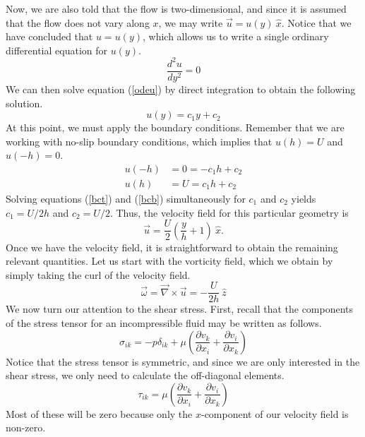 Now, we are also told that the flow is two-dimensional, and since it is assumed that the flow does not vary along $x$, we may write $\vec{u} = u(y)\ \hat{x}$. Notice that we have concluded that $u=u(y)$, which allows us to write a single ordinary differential equation for $u(y)$.
\begin{equation}
    \frac{d^2u}{dy^2} = 0
    \label{odeu}
\end{equation}
We can then solve equation (\ref{odeu}) by direct integration to obtain the following solution.
\begin{equation}
    u(y) = c_1 y + c_2
\end{equation}
At this point, we must apply the boundary conditions. Remember that we are working with no-slip boundary conditions, which implies that $u(h)=U$ and $u(-h)=0$.
\begin{align}
    u(-h) &= 0 = -c_1 h + c_2 \label{bct}\\
    u(h) &= U = c_1 h + c_2 \label{bcb}
\end{align}
Solving equations (\ref{bct}) and (\ref{bcb}) simultaneously for $c_1$ and $c_2$ yields $c_1 = U/2h$ and $c_2 = U/2$. Thus, the velocity field for this particular geometry is
\begin{equation}
    \boxed{\vec{u} = \frac{U}{2}\left(\frac{y}{h}+1\right)\ \hat{x}.}
\end{equation}
Once we have the velocity field, it is straightforward to obtain the remaining relevant quantities. Let us start with the vorticity field, which we obtain by simply taking the curl of the velocity field.
\begin{equation}
    \boxed{\vec{\omega} = \vec{\nabla}\times\vec{u} = -\frac{U}{2h}\ \hat{z}}
\end{equation}
We now turn our attention to the shear stress. First, recall that the components of the stress tensor for an incompressible fluid may be written as follows.
\begin{equation}
    \sigma_{ik} = -p\delta_{ik} + \mu\left(\frac{\partial v_k}{\partial x_i} + \frac{\partial v_i}{\partial x_k}\right)
\end{equation}
Notice that the stress tensor is symmetric, and since we are only interested in the shear stress, we only need to calculate the off-diagonal elements. 
\begin{equation}
    \tau_{ik} = \mu\left(\frac{\partial v_k}{\partial x_i} + \frac{\partial v_i}{\partial x_k}\right)
\end{equation}
Most of these will be zero because only the $x$-component of our velocity field is non-zero. 
